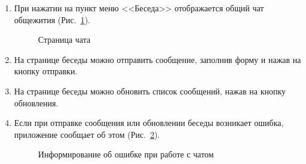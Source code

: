 \documentclass{../includes/TechDoc}
\begin{document}
\begin{enumerate}
        \item При нажатии на пункт меню <<Беседа>> отображается общий чат общежития (Рис.~\ref{ris:chat_page}).
        \begin{figure}[h]
            \centering
            \caption{Страница чата}
            \label{ris:chat_page}
        \end{figure}

        \item На странице беседы можно отправить сообщение, заполнив форму и нажав на кнопку отправки.

        \item На странице беседы можно обновить список сообщений, нажав на кнопку обновления.

        \item Если при отправке сообщения или обновлении беседы возникает ошибка, приложение сообщает об этом (Рис.~\ref{ris:chat_page_error}).
        \begin{figure}[h]
            \centering
            \caption{Информирование об ошибке при работе с чатом}
            \label{ris:chat_page_error}
        \end{figure}
    \end{enumerate}
\end{document}
